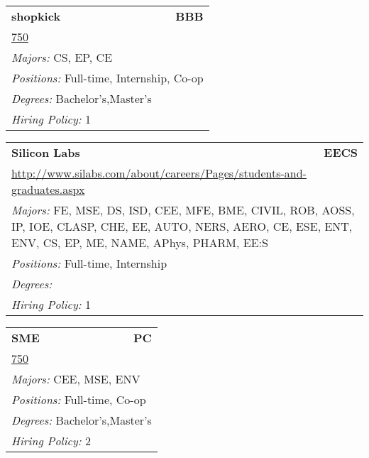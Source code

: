 \documentclass[twoside]{article}
\begin{document}
\begin{center}
\begin{multicols}{3}
\begin{FlushLeft}
\begin{minipage}{.9\columnwidth}
\end{minipage}
 
\begin{minipage}{.9\columnwidth}\begin{tabularx}{.95\columnwidth}{Xr}
                 {\Large\bf shopkick} & {\Large\bf BBB}\\
    \multicolumn{2}{p{.95\columnwidth}}{\url{750}}\\
    \multicolumn{2}{p{.95\columnwidth}}{\emph{Majors:} CS, EP, CE}\\
    \multicolumn{2}{p{.95\columnwidth}}{\emph{Positions:} Full-time, Internship, Co-op}\\
    \multicolumn{2}{p{.95\columnwidth}}{\emph{Degrees:} Bachelor's,Master's}\\
    \multicolumn{2}{p{.95\columnwidth}}{\emph{Hiring Policy:} 1}\\
    \end{tabularx}
    
\end{minipage}
 
\begin{minipage}{.9\columnwidth}\begin{tabularx}{.95\columnwidth}{Xr}
                 {\Large\bf Silicon Labs} & {\Large\bf EECS}\\
    \multicolumn{2}{p{.95\columnwidth}}{\url{http://www.silabs.com/about/careers/Pages/students-and-graduates.aspx}}\\
    \multicolumn{2}{p{.95\columnwidth}}{\emph{Majors:} FE, MSE, DS, ISD, CEE, MFE, BME, CIVIL, ROB, AOSS, IP, IOE, CLASP, CHE, EE, AUTO, NERS, AERO, CE, ESE, ENT, ENV, CS, EP, ME, NAME, APhys, PHARM, EE:S}\\
    \multicolumn{2}{p{.95\columnwidth}}{\emph{Positions:} Full-time, Internship}\\
    \multicolumn{2}{p{.95\columnwidth}}{\emph{Degrees:} }\\
    \multicolumn{2}{p{.95\columnwidth}}{\emph{Hiring Policy:} 1}\\
    \end{tabularx}
    
\end{minipage}
 
\begin{minipage}{.9\columnwidth}\begin{tabularx}{.95\columnwidth}{Xr}
                 {\Large\bf SME} & {\Large\bf PC}\\
    \multicolumn{2}{p{.95\columnwidth}}{\url{750}}\\
    \multicolumn{2}{p{.95\columnwidth}}{\emph{Majors:} CEE, MSE, ENV}\\
    \multicolumn{2}{p{.95\columnwidth}}{\emph{Positions:} Full-time, Co-op}\\
    \multicolumn{2}{p{.95\columnwidth}}{\emph{Degrees:} Bachelor's,Master's}\\
    \multicolumn{2}{p{.95\columnwidth}}{\emph{Hiring Policy:} 2}\\
    \end{tabularx}
    

\end{minipage}
\end{FlushLeft}
\end{multicols}
\end{center}
\end{document}
